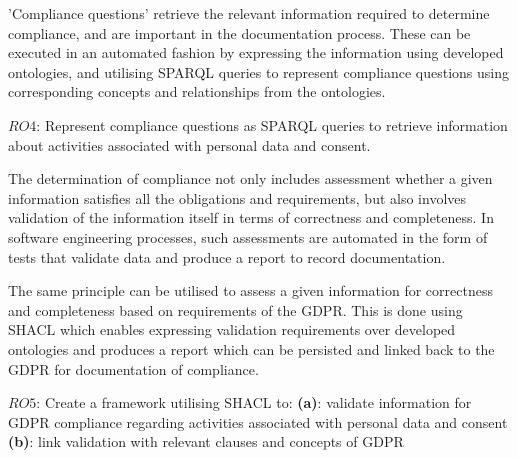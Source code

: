'Compliance questions' retrieve the relevant information required to determine compliance, and are important in the documentation process. These can be executed in an automated fashion by expressing the information using developed ontologies, and utilising SPARQL queries to represent compliance questions using corresponding concepts and relationships from the ontologies.
\begin{framed}
$RO4$: Represent compliance questions as SPARQL queries to retrieve information about activities associated with personal data and consent.
\end{framed}

The determination of compliance not only includes assessment whether a given information satisfies all the obligations and requirements, but also involves validation of the information itself in terms of correctness and completeness.
In software engineering processes, such assessments are automated in the form of tests that validate data and produce a report to record documentation.

The same principle can be utilised to assess a given information for correctness and completeness based on requirements of the GDPR.
This is done using SHACL which enables expressing validation requirements over developed ontologies and produces a report which can be persisted and linked back to the GDPR for documentation of compliance.
\begin{framed}
$RO5$: Create a framework utilising SHACL to:
\newline\indent\indent\textbf{(a)}: validate information for GDPR compliance regarding activities associated with personal data and consent
\newline\indent\indent\textbf{(b)}: link validation with relevant clauses and concepts of GDPR
\end{framed}


